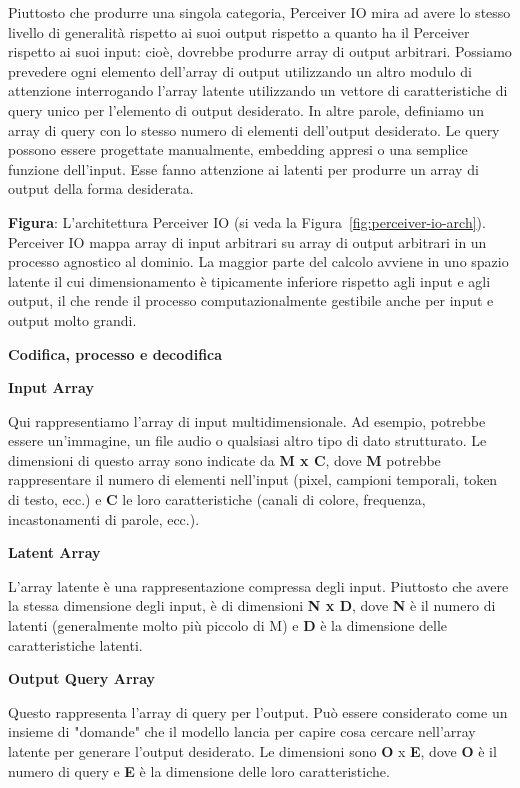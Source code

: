 \documentclass[
  11pt,
]{article}
\begin{document}
Piuttosto che produrre una singola categoria, Perceiver IO mira ad avere
lo stesso livello di generalità rispetto ai suoi output rispetto a
quanto ha il Perceiver rispetto ai suoi input: cioè, dovrebbe produrre
array di output arbitrari. Possiamo prevedere ogni elemento
dell'array di output utilizzando un altro modulo di
attenzione interrogando l'array latente utilizzando un
vettore di caratteristiche di query unico per l'elemento
di output desiderato. In altre parole, definiamo un array di query con
lo stesso numero di elementi dell'output desiderato. Le
query possono essere progettate manualmente, embedding appresi o una
semplice funzione dell'input. Esse fanno attenzione ai
latenti per produrre un array di output della forma desiderata.


\textbf{Figura}: L'architettura Perceiver IO (si veda la Figura~\ref{fig:perceiver-io-arch}).
Perceiver IO mappa array di input arbitrari su array di output arbitrari
in un processo agnostico al dominio. La maggior parte del calcolo
avviene in uno spazio latente il cui dimensionamento è tipicamente
inferiore rispetto agli input e agli output, il che rende il processo
computazionalmente gestibile anche per input e output molto grandi.

\textbf{Codifica, processo e decodifica}

\textbf{Input Array}

Qui rappresentiamo l'array di input multidimensionale.
Ad esempio, potrebbe essere un'immagine, un file audio o
qualsiasi altro tipo di dato strutturato. Le dimensioni di questo array
sono indicate da \textbf{M x C}, dove \textbf{M} potrebbe rappresentare
il numero di elementi nell'input (pixel, campioni
temporali, token di testo, ecc.) e \textbf{C} le loro caratteristiche
(canali di colore, frequenza, incastonamenti di parole, ecc.).

\textbf{Latent Array}

L'array latente è una rappresentazione compressa degli
input. Piuttosto che avere la stessa dimensione degli input, è di
dimensioni \textbf{N x D}, dove \textbf{N} è il numero di latenti
(generalmente molto più piccolo di M) e \textbf{D} è la dimensione delle
caratteristiche latenti.

\textbf{Output Query Array}

Questo rappresenta l'array di query per
l'output. Può essere considerato come un insieme di
"domande" che il modello lancia per capire cosa cercare
nell'array latente per generare l'output
desiderato. Le dimensioni sono \textbf{O} x \textbf{E}, dove \textbf{O}
è il numero di query e \textbf{E} è la dimensione delle loro
caratteristiche.
\end{document}
